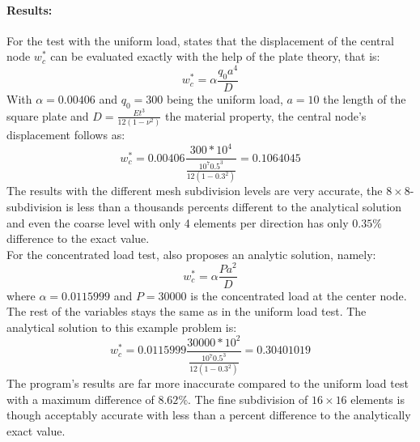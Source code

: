   \paragraph{Results:} For the test with the uniform load, \cite{jin1994analysis} states that the displacement of the central node $w_c^*$ can be evaluated exactly with the help of the plate theory, that is:
  \begin{equation}\label{eq:test-WC*q}
  w_c^* = \alpha \frac{q_0 a^4}{D}
  \end{equation}
  With $\alpha = 0.00406$ and $q_0 = 300$ being the uniform load, $a = 10$ the length of the square plate and $D = \frac{E t^3}{12 (1-\nu^2)}$ the material property, the central node's displacement follows as:
  \begin{equation*}
  w_c^* = 0.00406 \frac{300 * 10^4}{\frac{10^7 0.5^3}{12(1-0.3^2)}} = 0.1064045
  \end{equation*}
  The results with the different mesh subdivision levels are very accurate, the $8\!\times\!8$-subdivision is less than a thousands percents different to the analytical solution and even the coarse level with only 4 elements per direction has only $0.35\%$ difference to the exact value.\\
  For the concentrated load test, \cite{jin1994analysis} also proposes an analytic solution, namely:
  \begin{equation}\label{eq:test-WC*P}
  w_c^* = \alpha \frac{P a^2}{D}
  \end{equation}
  where $\alpha = 0.0115999$ and $P = 30000$ is the concentrated load at the center node. The rest of the variables stays the same as in the uniform load test. The analytical solution to this example problem is:
  \begin{equation*}
  w_c^* = 0.0115999 \frac{30000 * 10^2}{\frac{10^7 0.5^3}{12(1-0.3^2)}} = 0.30401019
  \end{equation*}
  The program's results are far more inaccurate compared to the uniform load test with a maximum difference of $8.62\%$. The fine subdivision of $16\!\times\!16$ elements is though acceptably accurate with less than a percent difference to the analytically exact value.
